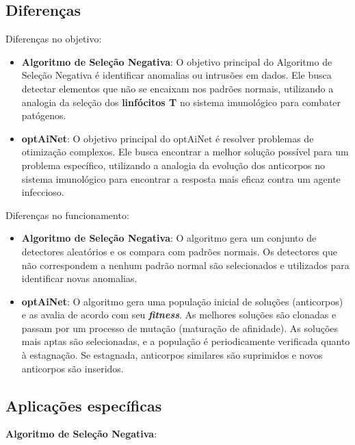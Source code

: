 \subsection{Diferenças}

Diferenças no objetivo:

\begin{itemize}
    \item \textbf{Algoritmo de Seleção Negativa}: O objetivo principal do Algoritmo de Seleção Negativa é identificar anomalias ou intrusões em dados. Ele busca detectar elementos que não se encaixam nos padrões normais, utilizando a analogia da seleção dos \textbf{linfócitos T} no sistema imunológico para combater patógenos.
    
    \item \textbf{optAiNet}: O objetivo principal do optAiNet é resolver problemas de otimização complexos. Ele busca encontrar a melhor solução possível para um problema específico, utilizando a analogia da evolução dos anticorpos no sistema imunológico para encontrar a resposta mais eficaz contra um agente infeccioso.
\end{itemize}

\noindent Diferenças no funcionamento:

\begin{itemize}
    \item \textbf{Algoritmo de Seleção Negativa}: O algoritmo gera um conjunto de detectores aleatórios e os compara com padrões normais. Os detectores que não correspondem a nenhum padrão normal são selecionados e utilizados para identificar novas anomalias.

    \item \textbf{optAiNet}: O algoritmo gera uma população inicial de soluções (anticorpos) e as avalia de acordo com seu \textbf{\textit{fitness}}. As melhores soluções são clonadas e passam por um processo de mutação (maturação de afinidade). As soluções mais aptas são selecionadas, e a população é periodicamente verificada quanto à estagnação. Se estagnada, anticorpos similares são suprimidos e novos anticorpos são inseridos.
\end{itemize}

\subsection{Aplicações específicas} \thispagestyle{mystyle}

\textbf{Algoritmo de Seleção Negativa}:

